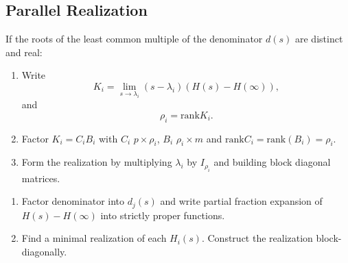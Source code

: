 \documentclass{report}
\begin{document}
\subsection{Parallel Realization}
If the roots of the least common multiple of the denominator $d(s)$
are distinct and real:
\begin{enumerate}
  \item{
    Write
    $$
    K_i = \lim_{s \to \lambda_i} (s - \lambda_i) (H(s) - H(\infty)),
    $$
    and
    $$
    \rho_i = \mathrm{rank} K_i.
    $$
  }
  \item{
    Factor $K_i = C_i B_i$ with $C_i$ $p \times \rho_i$, $B_i$ $\rho_i
    \times m$ and $\mathrm{rank}{C_i} = \mathrm{rank}(B_i) = \rho_i$.
  }
  \item{
    Form the realization by multiplying $\lambda_i$ by $I_{\rho_i}$
    and building block diagonal matrices.
  }
\end{enumerate}

\begin{enumerate}
  \item{
    Factor denominator into $d_j(s)$ and write partial fraction
    expansion of $H(s) - H(\infty)$ into strictly proper functions.
  }
  \item{
    Find a minimal realization of each $H_i(s)$. Construct the
    realization block-diagonally.
  }
\end{enumerate}
\end{document}
